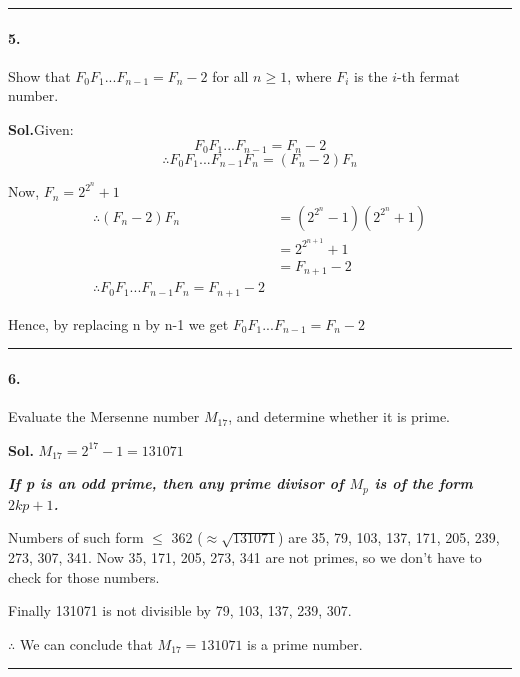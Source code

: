 \documentclass[12pt,oneside,reqno]{amsart}
\begin{document}
\par\noindent\textcolor{gray}{\rule{\textwidth}{0.5pt}}
\smallskip

\paragraph*{5.} Show that $F_0F_1 . . . F_{n-1} = F_n - 2$ for all $n \ge 1$, where $F_i$ is the $i$-th fermat number.

\bigskip
\textbf{Sol.}Given:
$$
F_0F_1 . . . F_{n-1} = F_n - 2
$$
$$
\therefore F_0F_1 . . . F_{n-1}F_n = (F_n - 2)F_n
$$

Now, $F_n = 2^{2^n} + 1$
\begin{align*}
    \therefore (F_n - 2)F_n &= (2^{2^n} - 1)(2^{2^n} + 1) \\
                            &= 2^{2^{n+1}} + 1 \\
                            &= F_{n+1} - 2 \\
    \therefore \boxed{F_0F_1 . . . F_{n-1}F_n = F_{n+1} - 2}
\end{align*}

Hence, by replacing n by n-1 we get $F_0F_1 . . . F_{n-1} = F_{n} - 2$

\par\noindent\textcolor{gray}{\rule{\textwidth}{0.5pt}}
\smallskip

\paragraph*{6.} Evaluate the Mersenne number $M_{17}$, and determine whether it is prime.

\bigskip
\textbf{Sol.}
$M_{17} = 2^{17} - 1 = 131071$

\textbf{\textit{ If p is an odd prime, then any prime divisor of $M_p$ is of the form $2kp+1$.}}

\smallskip
Numbers of such form $\le$ 362 ($\approx \sqrt{131071}$) are 35, 79, 103, 137, 171, 205, 239, 273, 307, 341. Now 35, 171, 205, 273, 341 are not primes, so we don't have to check for those numbers.

\smallskip
Finally 131071 is not divisible by 79, 103, 137, 239, 307.

$\therefore$ We can conclude that $M_{17} = 131071$ is a prime number.

\par\noindent\textcolor{gray}{\rule{\textwidth}{0.5pt}}
\smallskip
\end{document}
